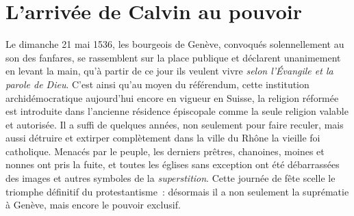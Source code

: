\documentclass[french,twoside]{book} %
\newcommand\chapteropen{} %
\newcommand\chaptercont{} %
\begin{document}
\chapteropen

\chapter[{L’arrivée de Calvin au pouvoir}]{L’arrivée de Calvin au pouvoir}
\renewcommand{\leftmark}{L’arrivée de Calvin au pouvoir}


\chaptercont
\noindent Le dimanche 21 mai 1536, les bourgeois de Genève, convoqués solennellement au son des fanfares, se rassemblent sur la place publique et déclarent unanimement en levant la main, qu’à partir de ce jour ils veulent vivre \emph{selon l’Évangile et la parole de Dieu}. C’est ainsi qu’au moyen du référendum, cette institution archidémocratique aujourd’hui encore en vigueur en Suisse, la religion réformée est introduite dans l’ancienne résidence épiscopale comme la seule religion valable et autorisée. Il a suffi de quelques années, non seulement pour faire reculer, mais aussi détruire et extirper complètement dans la ville du Rhône la vieille foi catholique. Menacés par le peuple, les derniers prêtres, chanoines, moines et nonnes ont pris la fuite, et toutes les églises sans exception ont été débarrassées des images et autres symboles de la \emph{superstition}. Cette journée de fête scelle le triomphe définitif du protestantisme : désormais il a non seulement la suprématie à Genève, mais encore le pouvoir exclusif.\par
\end{document}
